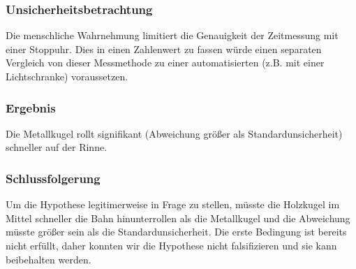 \documentclass[
	a4paper,
	12pt,
	pagesize,
	ngerman
]{scrartcl}
\begin{document}
	\subsubsection{Unsicherheitsbetrachtung}
	Die menschliche Wahrnehmung limitiert die Genauigkeit der Zeitmessung mit einer Stoppuhr. Dies in einen Zahlenwert zu fassen würde einen separaten Vergleich von dieser Messmethode zu einer automatisierten (z.B. mit einer Lichtschranke) voraussetzen.
	\subsubsection{Ergebnis}
	Die Metallkugel rollt signifikant (Abweichung größer als Standardunsicherheit) schneller auf der Rinne.
	\subsubsection{Schlussfolgerung}
	Um die Hypothese legitimerweise in Frage zu stellen, müsste die Holzkugel im Mittel schneller die Bahn hinunterrollen als die Metallkugel und die Abweichung müsste größer sein als die Standardunsicherheit. Die erste Bedingung ist bereits nicht erfüllt, daher konnten wir die Hypothese nicht falsifizieren und sie kann beibehalten werden.
	
	
\end{document}
